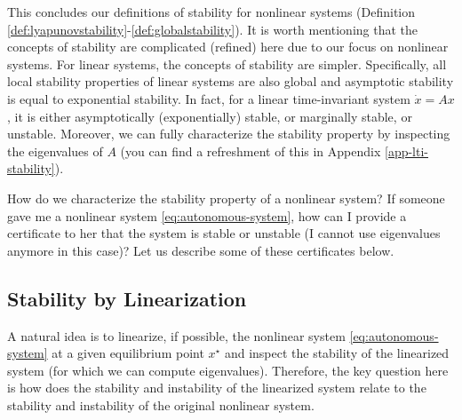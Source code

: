 \documentclass[
]{book}
\theoremstyle{definition}
\theoremstyle{definition}
\theoremstyle{definition}
\theoremstyle{definition}
\theoremstyle{remark}
\begin{document}
This concludes our definitions of stability for nonlinear systems (Definition \ref{def:lyapunovstability}-\ref{def:globalstability}). It is worth mentioning that the concepts of stability are complicated (refined) here due to our focus on nonlinear systems. For linear systems, the concepts of stability are simpler. Specifically, all local stability properties of linear systems are also global and asymptotic stability is equal to exponential stability. In fact, for a linear time-invariant system \(\dot{x} = Ax\), it is either asymptotically (exponentially) stable, or marginally stable, or unstable. Moreover, we can fully characterize the stability property by inspecting the eigenvalues of \(A\) (you can find a refreshment of this in Appendix \ref{app-lti-stability}).

How do we characterize the stability property of a nonlinear system? If someone gave me a nonlinear system \eqref{eq:autonomous-system}, how can I provide a certificate to her that the system is stable or unstable (I cannot use eigenvalues anymore in this case)? Let us describe some of these certificates below.

\hypertarget{stability-by-linearization}{%
\subsection{Stability by Linearization}\label{stability-by-linearization}}

A natural idea is to linearize, if possible, the nonlinear system \eqref{eq:autonomous-system} at a given equilibrium point \(x^\star\) and inspect the stability of the linearized system (for which we can compute eigenvalues). Therefore, the key question here is how does the stability and instability of the linearized system relate to the stability and instability of the original nonlinear system.
\end{document}
